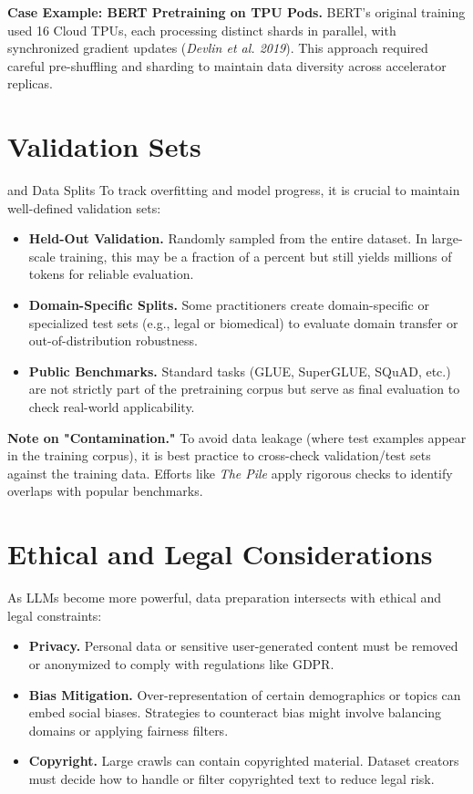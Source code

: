 \noindent
\textbf{Case Example: BERT Pretraining on TPU Pods.}  
BERT's original training used 16 Cloud TPUs, each processing distinct shards in parallel, with synchronized gradient updates (\emph{Devlin et al. 2019}). This approach required careful pre-shuffling and sharding to maintain data diversity across accelerator replicas.

\section{Validation Sets} and Data Splits
\noindent
To track overfitting and model progress, it is crucial to maintain well-defined validation sets:
\begin{itemize}
    \item \textbf{Held-Out Validation.} Randomly sampled from the entire dataset. In large-scale training, this may be a fraction of a percent but still yields millions of tokens for reliable evaluation.
    \item \textbf{Domain-Specific Splits.} Some practitioners create domain-specific or specialized test sets (e.g., legal or biomedical) to evaluate domain transfer or out-of-distribution robustness.
    \item \textbf{Public Benchmarks.} Standard tasks (GLUE, SuperGLUE, SQuAD, etc.) are not strictly part of the pretraining corpus but serve as final evaluation to check real-world applicability.
\end{itemize}

\noindent
\textbf{Note on "Contamination."}  
To avoid data leakage (where test examples appear in the training corpus), it is best practice to cross-check validation/test sets against the training data. Efforts like \emph{The Pile} apply rigorous checks to identify overlaps with popular benchmarks.

\section{Ethical and Legal Considerations}
\noindent
As LLMs become more powerful, data preparation intersects with ethical and legal constraints:
\begin{itemize}
    \item \textbf{Privacy.} Personal data or sensitive user-generated content must be removed or anonymized to comply with regulations like GDPR. 
    \item \textbf{Bias Mitigation.} Over-representation of certain demographics or topics can embed social biases. Strategies to counteract bias might involve balancing domains or applying fairness filters.
    \item \textbf{Copyright.} Large crawls can contain copyrighted material. Dataset creators must decide how to handle or filter copyrighted text to reduce legal risk.
\end{itemize}

